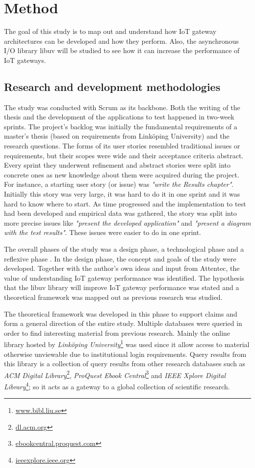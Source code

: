 \chapter{Method}
\label{cha:method}

The goal of this study is to map out and understand how IoT gateway
architectures can be developed and how they perform. Also, the asynchronous I/O
library libuv will be studied to see how it can increase the performance of IoT
gateways.

\section{Research and development methodologies}

The study was conducted with Scrum as its backbone. Both the writing of the
thesis and the development of the applications to test happened in two-week
sprints. The project's backlog was initially the fundamental requirements of a
master's thesis (based on requirements from Linköping University) and the
research questions. The forms of its user stories resembled traditional issues
or requirements, but their scopes were wide and their acceptance criteria
abstract. Every sprint they underwent refinement and abstract stories were
split into concrete ones as new knowledge about them were acquired during the
project. For instance, a starting user story (or issue) was \textit{"write the
Results chapter"}. Initially this story was very large, it was hard to do it in
one sprint and it was hard to know where to start. As time progressed and the
implementation to test had been developed and empirical data was gathered, the
story was split into more precise issues like \textit{"present the developed
application"} and \textit{"present a diagram with the test results"}. These
issues were easier to do in one sprint.

The overall phases of the study was a design phase, a technological phase
and a reflexive phase \cite{novikov2013research}. In the design phase, the
concept and goals of the study were developed. Together with the author's own
ideas and input from Attentec, the value of understanding IoT gateway
performance was identified. The hypothesis that the libuv library will improve
IoT gateway performance was stated and a theoretical framework was mapped out
as previous research was studied.

The theoretical framework was developed in this phase to support claims and
form a general direction of the entire study. Multiple databases were queried
in order to find interesting material from previous research. Mainly the online
library hosted by \textit{Linköping University}\footnote{\url{www.bibl.liu.se}}
was used since it allow access to material otherwise unviewable due to
institutional login requirements. Query results from this library is a
collection of query results from other research databases such as \textit{ACM
Digital Library}\footnote{\url{dl.acm.org}}, \textit{ProQuest Ebook
Central}\footnote{\url{ebookcentral.proquest.com}} and \textit{IEEE Xplore
Digital Library}\footnote{\url{ieeexplore.ieee.org}}; so it acts as a gateway
to a global collection of scientific research.

